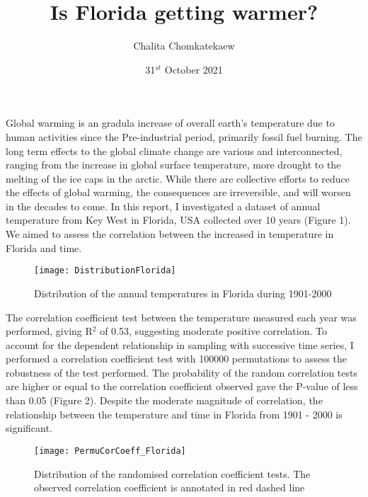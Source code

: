 \documentclass[10pt]{article}
\title{Is Florida getting warmer?}
\author{Chalita Chomkatekaew}
\date{31$^{st}$ October 2021}
\begin{document}
\maketitle
        
        Global warming is an gradula increase of overall earth's temperature due to human activities since the Pre-industrial period, primarily fossil fuel burning.
        The long term effects to the global climate change are various and interconnected, ranging from the increase in global surface temperature, more drought to the melting of the ice caps in the arctic.
        While there are collective efforts to reduce the effects of global warming, the consequences are irreversible, and will worsen in the decades to come.
        In this report, I investigated a dataset of annual temperature from Key West in Florida, USA collected over 10 years (Figure 1).
        We aimed to assess the correlation between the increased in temperature in Florida and time.
        
        \begin{figure}[h]
            \centering
            \texttt{[image: DistributionFlorida]}
            \caption{Distribution of the annual temperatures in Florida during 1901-2000}
            \label{fig:DistributionFlorida1}
        \end{figure}

    The correlation coefficient test between the temperature measured each year was performed, giving R$^{2}$ of 0.53, suggesting moderate positive correlation.
    To account for the dependent relationship in sampling with successive time series, I performed a correlation coefficient test with 100000 permutations to assess the robustness of the test performed.
    The probability of the random correlation tests are higher or equal to the correlation coefficient observed gave the P-value of less than 0.05 (Figure 2).
    Despite the moderate magnitude of correlation, the relationship between the temperature and time in Florida from 1901 - 2000 is significant.
    
        \begin{figure}[h]
            \centering
            \texttt{[image: PermuCorCoeff\_Florida]}
            \caption{Distribution of the randomised correlation coefficient tests. The observed correlation coefficient is annotated in red dashed line}
            \label{fig:PermuCorCoeff_Florida1}
        \end{figure}
\end{document}

